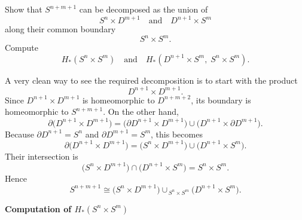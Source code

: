 \begin{problem}
Show that \(S^{n+m+1}\) can be decomposed as the union of
\[
S^n \times D^{m+1}
\quad\text{and}\quad
D^{n+1} \times S^m
\]
along their common boundary
\[
S^n \times S^m.
\]
Compute
\[
H_*(S^n \times S^m)
\quad\text{and}\quad
H_*(D^{n+1} \times S^m,\; S^n \times S^m).
\]
\end{problem}

\begin{solution}
A very clean way to see the required decomposition is to start with the product
\[
D^{n+1} \times D^{m+1}.
\]
Since \(D^{n+1} \times D^{m+1}\) is homeomorphic to \(D^{n+m+2}\), its boundary is homeomorphic to \(S^{n+m+1}\). On the other hand,
\[
\partial\bigl(D^{n+1} \times D^{m+1}\bigr)
=
\bigl(\partial D^{n+1} \times D^{m+1}\bigr)
\cup
\bigl(D^{n+1} \times \partial D^{m+1}\bigr).
\]
Because \(\partial D^{n+1} = S^n\) and \(\partial D^{m+1} = S^m\), this becomes
\[
\partial\bigl(D^{n+1} \times D^{m+1}\bigr)
=
\bigl(S^n \times D^{m+1}\bigr)
\cup
\bigl(D^{n+1} \times S^m\bigr).
\]
Their intersection is
\[
\bigl(S^n \times D^{m+1}\bigr)\cap\bigl(D^{n+1} \times S^m\bigr)
=
S^n \times S^m.
\]
Hence
\[
S^{n+m+1}
\cong
\bigl(S^n \times D^{m+1}\bigr)\cup_{\,S^n \times S^m}\bigl(D^{n+1} \times S^m\bigr).
\]


\medskip
\noindent\textbf{Computation of \(H_*(S^n \times S^m)\)}\par
\smallskip



\end{solution}
